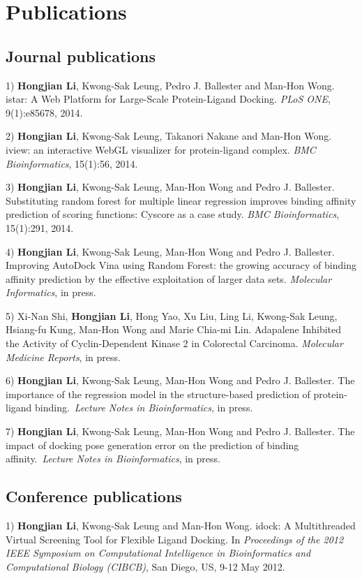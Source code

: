 \chapter{Publications}

\section{Journal publications}

1) \textbf{Hongjian Li}, Kwong-Sak Leung, Pedro J. Ballester and Man-Hon Wong. istar: A Web Platform for Large-Scale Protein-Ligand Docking. \textit{PLoS ONE}, 9(1):e85678, 2014.

2) \textbf{Hongjian Li}, Kwong-Sak Leung, Takanori Nakane and Man-Hon Wong. iview: an interactive WebGL visualizer for protein-ligand complex. \textit{BMC Bioinformatics}, 15(1):56, 2014.

3) \textbf{Hongjian Li}, Kwong-Sak Leung, Man-Hon Wong and Pedro J. Ballester. Substituting random forest for multiple linear regression improves binding affinity prediction of scoring functions: Cyscore as a case study. \textit{BMC Bioinformatics}, 15(1):291, 2014.

4) \textbf{Hongjian Li}, Kwong-Sak Leung, Man-Hon Wong and Pedro J. Ballester. Improving AutoDock Vina using Random Forest: the growing accuracy of binding affinity prediction by the effective exploitation of larger data sets. \textit{Molecular Informatics}, in press.

5) Xi-Nan Shi, \textbf{Hongjian Li}, Hong Yao, Xu Liu, Ling Li, Kwong-Sak Leung, Hsiang-fu Kung, Man-Hon Wong and Marie Chia-mi Lin. Adapalene Inhibited the Activity of Cyclin-Dependent Kinase 2 in Colorectal Carcinoma. \textit{Molecular Medicine Reports}, in press.

6) \textbf{Hongjian Li}, Kwong-Sak Leung, Man-Hon Wong and Pedro J. Ballester. The importance of the regression model in the structure-based prediction of protein-ligand binding. \textit{Lecture Notes in Bioinformatics}, in press.

7) \textbf{Hongjian Li}, Kwong-Sak Leung, Man-Hon Wong and Pedro J. Ballester. The impact of docking pose generation error on the prediction of binding affinity. \textit{Lecture Notes in Bioinformatics}, in press.

\section{Conference publications}

1) \textbf{Hongjian Li}, Kwong-Sak Leung and Man-Hon Wong. idock: A Multithreaded Virtual Screening Tool for Flexible Ligand Docking. In \textit{Proceedings of the 2012 IEEE Symposium on Computational Intelligence in Bioinformatics and Computational Biology (CIBCB)}, San Diego, US, 9-12 May 2012.


